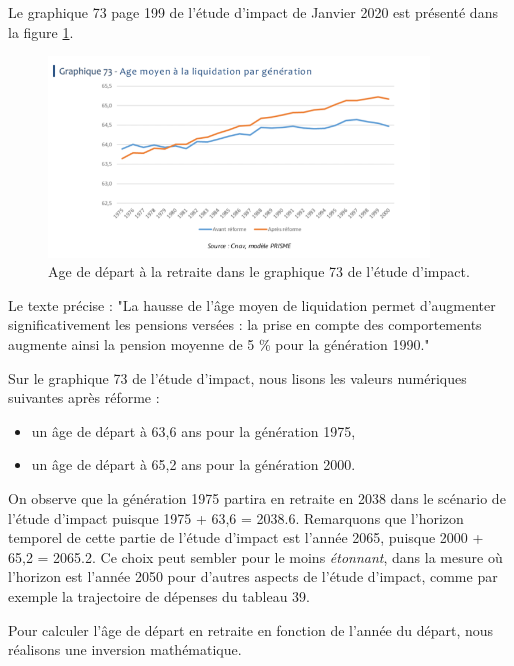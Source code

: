 \documentclass[10pt]{article}
\begin{document}
Le graphique 73 page 199 de l'étude d'impact de Janvier 2020 est présenté 
dans la figure \ref{fig-age-etude-impact-graphique-73}.

\begin{figure}
\begin{center}
\includegraphics[width=0.9\textwidth]{../Figures-Etude-Impact/EtudeImpact-Graphique-73-AgeDepartRetraite.png}
\end{center}
\caption{Age de départ à la retraite dans le graphique 73 de l'étude d'impact.}
\label{fig-age-etude-impact-graphique-73}
\end{figure}

Le texte précise : "La hausse de l’âge moyen de liquidation permet d’augmenter 
significativement les pensions versées : la prise en compte des comportements 
augmente ainsi la pension moyenne de 5 \% pour la génération 1990."

Sur le graphique 73 de l'étude d'impact, nous lisons les valeurs numériques 
suivantes après réforme :
\begin{itemize}
\item un âge de départ à 63,6 ans pour la génération 1975,
\item un âge de départ à 65,2 ans pour la génération 2000.
\end{itemize}

On observe que la génération 1975 partira en retraite en 2038 dans le scénario de l'étude d'impact puisque 1975 + 63,6 = 2038.6.
Remarquons que l'horizon temporel de cette partie de l'étude d'impact est l'année 2065, puisque 2000 + 65,2 = 2065.2. 
Ce choix peut sembler pour le moins \emph{étonnant}, dans la mesure où l'horizon 
est l'année 2050 pour d'autres aspects de l'étude d'impact, 
comme par exemple la trajectoire de dépenses du tableau 39. 

Pour calculer l'âge de départ en retraite en fonction de l'année du départ, 
nous réalisons une inversion mathématique.  
\end{document}
